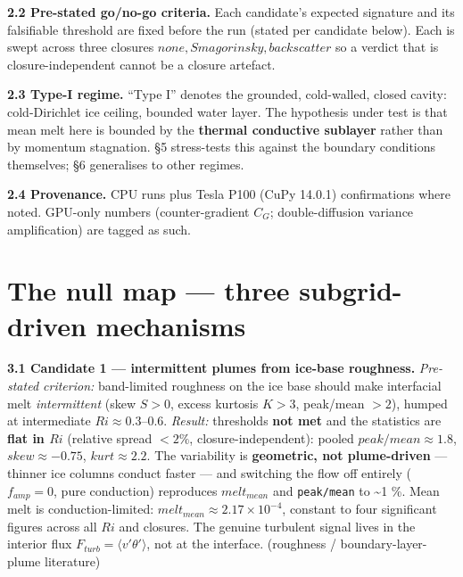 \documentclass[tc, manuscript]{copernicus}
\begin{document}
\textbf{2.2 Pre-stated go/no-go criteria.} Each candidate's expected signature and its falsifiable threshold are fixed before the run (stated per candidate below). Each is swept across three closures ${none, Smagorinsky, backscatter}$ so a verdict that is closure-independent cannot be a closure artefact.

\textbf{2.3 Type-I regime.} ``Type I'' denotes the grounded, cold-walled, closed cavity: cold-Dirichlet ice ceiling, bounded water layer. The hypothesis under test is that mean melt here is bounded by the \textbf{thermal conductive sublayer} rather than by momentum stagnation. §5 stress-tests this against the boundary conditions themselves; §6 generalises to other regimes.

\textbf{2.4 Provenance.} CPU runs plus Tesla P100 (CuPy 14.0.1) confirmations where noted. GPU-only numbers (counter-gradient $C_{G}$; double-diffusion variance amplification) are tagged as such.

\section{The null map — three subgrid-driven mechanisms}

\textbf{3.1 Candidate 1 — intermittent plumes from ice-base roughness.} \emph{Pre-stated criterion:} band-limited roughness on the ice base should make interfacial melt \emph{intermittent} (skew $S>0$, excess kurtosis $K>3$, peak/mean $>2$), humped at intermediate $Ri\approx 0.3\mbox{--}0.6$. \emph{Result:} thresholds \textbf{not met} and the statistics are \textbf{flat in $Ri$} (relative spread $<2\%$, closure-independent): pooled $peak/mean\approx 1.8$, $skew\approx -0.75$, $kurt\approx 2.2$. The variability is \textbf{geometric, not plume-driven} — thinner ice columns conduct faster — and switching the flow off entirely ($f_{amp}=0$, pure conduction) reproduces $melt_{mean}$ and \texttt{peak/\allowbreak{}mean} to \textasciitilde{}1 \%. Mean melt is conduction-limited: $melt_{mean}\approx 2.17\times 10^{-4}$, constant to four significant figures across all $Ri$ and closures. The genuine turbulent signal lives in the interior flux $F_{turb}=\langle v'\theta '\rangle $, not at the interface. (roughness / boundary-layer-plume literature)
\end{document}
